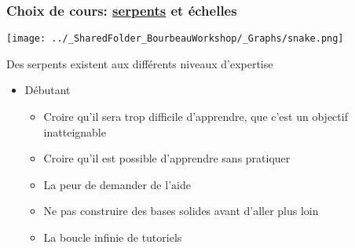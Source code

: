 \documentclass{beamer}
\begin{document}

  \begin{frame}
    
      \frametitle{Choix de cours: \uline{serpents} et échelles} \vspace{1cm}
      
        \begin{center}
        
          \texttt{[image: ../\_SharedFolder\_BourbeauWorkshop/\_Graphs/snake.png]}
         
        \end{center} 
        
  Des serpents existent aux différents niveaux d'expertise
      
    \begin{itemize}
       
      \item{Débutant}
        
          \begin{itemize}
            \item Croire qu'il sera trop difficile d'apprendre, que c'est un objectif inatteignable
            \item Croire qu'il est possible d'apprendre sans pratiquer
            \item La peur de demander de l'aide
            \item Ne pas construire des bases solides avant d'aller plus loin
            \item La boucle infinie de tutoriels

          \end{itemize}
        
        \end{itemize}
        
     \end{frame}
  
\end{document}
